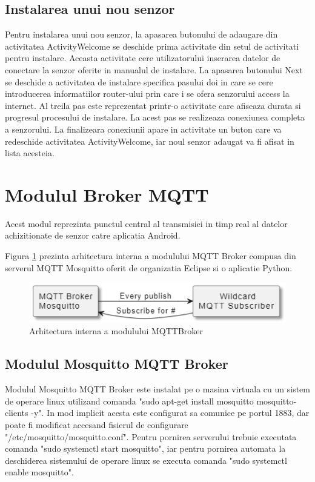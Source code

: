 \subsection{Instalarea unui nou senzor}\label{subsec:pi_appandroid_instalare_senzor}
Pentru instalarea unui nou senzor, la apasarea butonului de adaugare din activitatea ActivityWelcome se deschide prima activitate din setul de activitati pentru instalare. 
Aceasta activitate cere utilizatorului inserarea datelor de conectare la senzor oferite in manualul de instalare. La apasarea butonului Next se deschide a activitatea de 
instalare specifica pasului doi in care se cere introducerea informatiilor router-ului prin care i se ofera senzorului access la internet. Al treila pas este reprezentat 
printr-o activitate care afiseaza durata si progresul procesului de instalare. La acest pas se realizeaza conexiunea completa a senzorului. La finalizeara conexiunii apare 
in activitate un buton care va redeschide activitatea ActivityWelcome, iar noul senzor adaugat va fi afisat in lista acesteia. 

\section{Modulul Broker MQTT}\label{sec:pi_mqttbroker}
Acest modul reprezinta punctul central al transmisiei in timp real al datelor achizitionate de senzor catre aplicatia Android.

Figura \ref{fig:MQTTBrokerInside} prezinta arhitectura interna a modulului MQTT Broker compusa din serverul MQTT Mosquitto oferit de organizatia Eclipse si o aplicatie 
Python.
\begin{figure}[H]
    \centering
    \includegraphics[scale=0.8]{figs/MQTTBrokerInside.png}
    \caption{Arhitectura interna a modulului MQTTBroker}
    \label{fig:MQTTBrokerInside}
\end{figure}

\subsection{Modulul Mosquitto MQTT Broker}\label{subsec:pi_mqttbroker_server}
Modulul Mosquitto MQTT Broker este instalat pe o masina virtuala cu un sistem de operare linux utilizand comanda "sudo apt-get install mosquitto mosquitto-clients -y". 
In mod implicit acesta este configurat sa comunice pe portul 1883, dar poate fi modificat accesand fisierul de configurare "/etc/mosquitto/mosquitto.conf". Pentru 
pornirea serverului trebuie executata comanda "sudo systemctl start mosquitto", iar pentru pornirea automata la deschiderea sistemului de operare linux se executa 
comanda "sudo systemctl enable mosquitto".

